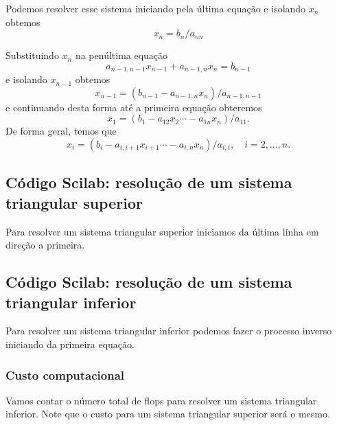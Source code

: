 Podemos resolver esse sistema iniciando pela última equação e isolando $x_n$ obtemos
\begin{equation}
 x_n = b_n/a_{nn}
\end{equation}

Substituindo $x_n$ na penúltima equação
\begin{equation}
 a_{n-1,n-1}x_{n-1}+a_{n-1,n}x_n = b_{n-1}
\end{equation}
e isolando $x_{n-1}$ obtemos
\begin{equation}
 x_{n-1} = (b_{n-1}-a_{n-1,n}x_n)/a_{n-1,n-1}
\end{equation}
e continuando desta forma até a primeira equação obteremos
\begin{equation}
 x_{1} = (b_{1}-a_{12}x_2 \cdots -a_{1n}x_n)/a_{11}.
\end{equation}
De forma geral, temos que
\begin{equation}
 x_{i} = (b_{i}-a_{i,i+1}x_{i+1} \cdots -a_{i,n}x_n)/a_{i,i}, \quad i=2,\dots,n.
\end{equation}

\ifisscilab
\subsection{Código Scilab: resolução de um sistema triangular superior}

Para resolver um sistema triangular superior iniciamos da última linha em direção a primeira.


\fi

\ifisscilab
\subsection{Código Scilab: resolução de um sistema triangular inferior}
Para resolver um sistema triangular inferior podemos fazer o processo inverso iniciando da primeira equação.




\subsubsection{Custo computacional}
Vamos contar o número total de flops para resolver um sistema triangular inferior. Note que o custo para um sistema triangular superior será o mesmo.


